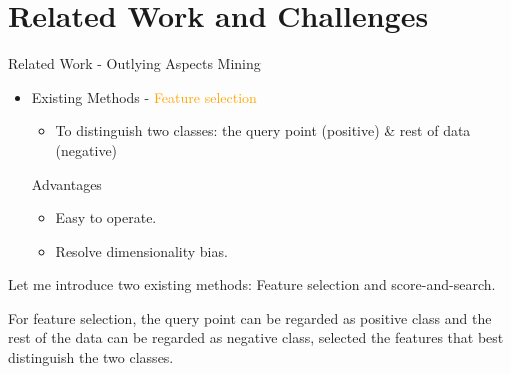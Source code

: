 \documentclass[
size=14pt,
paper=smartboard,  %
mode=present, 		%
display=slides, 	%
style=tuliplab,  	%
pauseslide,
fleqn,leqno]{powerdot}
\begin{document}
	
	\section{Related Work and Challenges}
	
	
	\begin{slide}{Related Work - Outlying Aspects Mining}
		\begin{itemize}
			\item
			Existing Methods - \textcolor{orange}{Feature selection}
			
			\begin{itemize}
				\item
				To distinguish two classes:
				the query point (positive) \& rest of data (negative)
			\end{itemize}
			\vspace{1cm}
			{
				Advantages
				\begin{itemize}
					\item
					\smallskip
					Easy to operate.
					
					\item
					\smallskip
					Resolve dimensionality bias.
				\end{itemize}
			}
		\end{itemize}
		
		\begin{note}
			Let me introduce two existing methods:
			Feature selection and score-and-search.
			
			For feature selection,
			the query point can be regarded as positive class and
			the rest of the data can be regarded as negative class,
			selected the features that best distinguish the two classes.
			

\end{note}
\end{slide}
\end{document}
